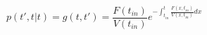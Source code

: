 \begin{equation}
p(t',t|t)=g(t,t')= \frac{F(t_{in})}{V(t_{in})} e^{-\int_{t_{in}}^t \frac{F(x,t_{in})}{V(x,t_{in})} dx}
\end{equation}